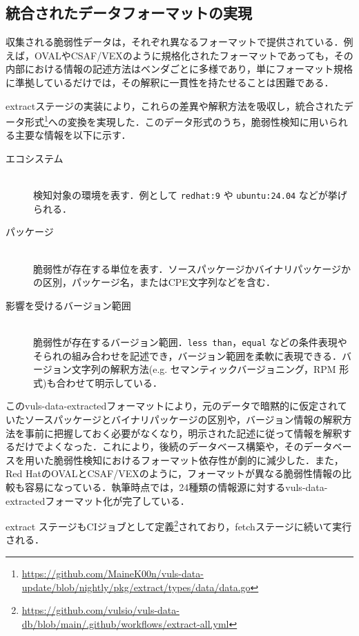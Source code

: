 \subsection{統合されたデータフォーマットの実現}

収集される脆弱性データは，それぞれ異なるフォーマットで提供されている．例えば，OVALやCSAF/VEXのように規格化されたフォーマットであっても，その内部における情報の記述方法はベンダごとに多様であり，単にフォーマット規格に準拠しているだけでは，その解釈に一貫性を持たせることは困難である．

extractステージの実装により，これらの差異や解釈方法を吸収し，統合されたデータ形式\footnote{\url{https://github.com/MaineK00n/vuls-data-update/blob/nightly/pkg/extract/types/data/data.go}}への変換を実現した．このデータ形式のうち，脆弱性検知に用いられる主要な情報を以下に示す．

\begin{description}
  \item [エコシステム] \mbox{} \\
    検知対象の環境を表す．例として \texttt{redhat:9} や \texttt{ubuntu:24.04} などが挙げられる．
  \item [パッケージ] \mbox{} \\
    脆弱性が存在する単位を表す．ソースパッケージかバイナリパッケージかの区別，パッケージ名，またはCPE文字列などを含む．
  \item [影響を受けるバージョン範囲] \mbox{} \\
    脆弱性が存在するバージョン範囲．\texttt{less than}，\texttt{equal} などの条件表現やそられの組み合わせを記述でき，バージョン範囲を柔軟に表現できる．バージョン文字列の解釈方法(e.g. セマンティックバージョニング，RPM 形式)も合わせて明示している．
\end{description}

このvuls-data-extractedフォーマットにより，元のデータで暗黙的に仮定されていたソースパッケージとバイナリパッケージの区別や，バージョン情報の解釈方法を事前に把握しておく必要がなくなり，明示された記述に従って情報を解釈するだけでよくなった．これにより，後続のデータベース構築や，そのデータベースを用いた脆弱性検知におけるフォーマット依存性が劇的に減少した．また，Red HatのOVALとCSAF/VEXのように，フォーマットが異なる脆弱性情報の比較も容易になっている．執筆時点では，24種類の情報源に対するvuls-data-extractedフォーマット化が完了している．

extract ステージもCIジョブとして定義\footnote{\url{https://github.com/vulsio/vuls-data-db/blob/main/.github/workflows/extract-all.yml}}されており，fetchステージに続いて実行される．

